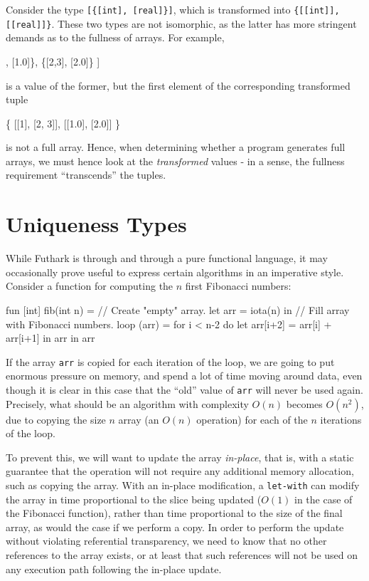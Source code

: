 \documentclass[oneside]{memoir}
\begin{document}
Consider the type \texttt{[\{[int], [real]\}]}, which is transformed
into \texttt{\{[[int]], [[real]]\}}.  These two types are not
isomorphic, as the latter has more stringent demands as to the
fullness of arrays.  For example,
\begin{colorcode}
[
 \{[1],   [1.0]\},
 \{[2,3], [2.0]\}
]
\end{colorcode}
is a value of the former, but the first element of the
corresponding transformed tuple
\begin{colorcode}
\{
 [[1],   [2, 3]],
 [[1.0], [2.0]]
\}
\end{colorcode}
is not a full array.  Hence, when determining whether a program
generates full arrays, we must hence look at the \textit{transformed}
values - in a sense, the fullness requirement ``transcends'' the
tuples.

\section{Uniqueness Types}
\label{sec:futhark-uniqueness-types}

While Futhark is through and through a pure functional language, it may
occasionally prove useful to express certain algorithms in an
imperative style.  Consider a function for computing the $n$ first
Fibonacci numbers:

\begin{colorcode}
fun [int] fib(int n) =
  // Create "empty" array.
  let arr = iota(n) in
  // Fill array with Fibonacci numbers.
  loop (arr) = for i < n-2 do
                 let arr[i+2] = arr[i] + arr[i+1]
                 in arr
  in arr
\end{colorcode}

If the array \texttt{arr} is copied for each iteration of the loop, we
are going to put enormous pressure on memory, and spend a lot of time
moving around data, even though it is clear in this case that the
``old'' value of \texttt{arr} will never be used again.  Precisely,
what should be an algorithm with complexity $O(n)$ becomes $O(n^2)$,
due to copying the size $n$ array (an $O(n)$ operation) for each of
the $n$ iterations of the loop.

To prevent this, we will want to update the array \textit{in-place},
that is, with a static guarantee that the operation will not require
any additional memory allocation, such as copying the array.  With an
in-place modification, a \texttt{let-with} can modify the array in
time proportional to the slice being updated ($O(1)$ in the case of
the Fibonacci function), rather than time proportional to the size of
the final array, as would the case if we perform a copy.  In order to
perform the update without violating referential transparency, we need
to know that no other references to the array exists, or at least that
such references will not be used on any execution path following the
in-place update.
\end{document}

